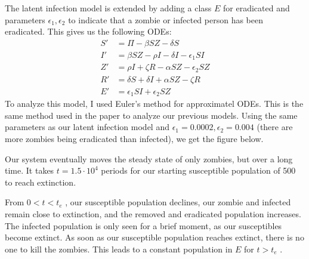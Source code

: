 \documentclass[]{article}
\begin{document}
The latent infection model is extended by adding a class $E$ for eradicated and
parameters $\epsilon_1, \epsilon_2$ to indicate that a zombie or infected person has been eradicated. This
gives us the following ODEs:
\begin{equation}
    \begin{aligned}
        S' &= \Pi - \beta S Z - \delta S \\
        I' &= \beta S Z - \rho I - \delta I - \epsilon_1 S I \\
        Z' &= \rho I + \zeta R - \alpha S Z - \epsilon_2 S Z \\
        R' &= \delta S + \delta I + \alpha S Z - \zeta R \\
        E' &= \epsilon_1 S I + \epsilon_2 S Z
    \end{aligned}
\end{equation}
To analyze this model, I used Euler’s method for approximatel ODEs. This is the
same method used in the paper to analyze our previous models. Using the same
parameters as our latent infection model and $\epsilon_1 = 0.0002, \epsilon_2 = 0.004$ (there are more
zombies being eradicated than infected), we get the figure below.
\begin{figure}[H]
\end{figure}
Our system eventually moves the steady state of only zombies, but over a long time. It
takes $t = 1.5 \cdot 10^4$ periods for our starting susceptible population of 500 to reach
extinction.

From $0 < t < t_e$ , our susceptible population declines, our zombie and infected remain
close to extinction, and the removed and eradicated population increases. The infected
population is only seen for a brief moment, as our susceptibles become extinct. As soon
as our susceptible population reaches extinct, there is no one to kill the zombies. This
leads to a constant population in $E$ for $t > t_e$ .
\end{document}
